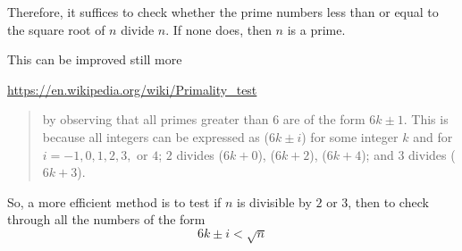 \documentclass[11pt, oneside]{article}
\begin{document}
Therefore, it suffices to check whether the prime numbers less than or equal to the square root of $n$ divide $n$.  If none does, then $n$ is a prime.

This can be improved still more

\url{https://en.wikipedia.org/wiki/Primality_test}

\begin{quote}by observing that all primes greater than $6$ are of the form $6k \pm 1$. This is because all integers can be expressed as ($6k \pm i$) for some integer $k$ and for $i = -1, 0, 1, 2, 3,$ or $4$; $2$ divides ($6k + 0$), ($6k + 2$), ($6k + 4$); and $3$ divides ($6k + 3$).\end{quote}

So, a more efficient method is to test if $n$ is divisible by $2$ or $3$, then to check through all the numbers of the form 
\[ 6k \pm i < \sqrt{n} \]
\end{document}
